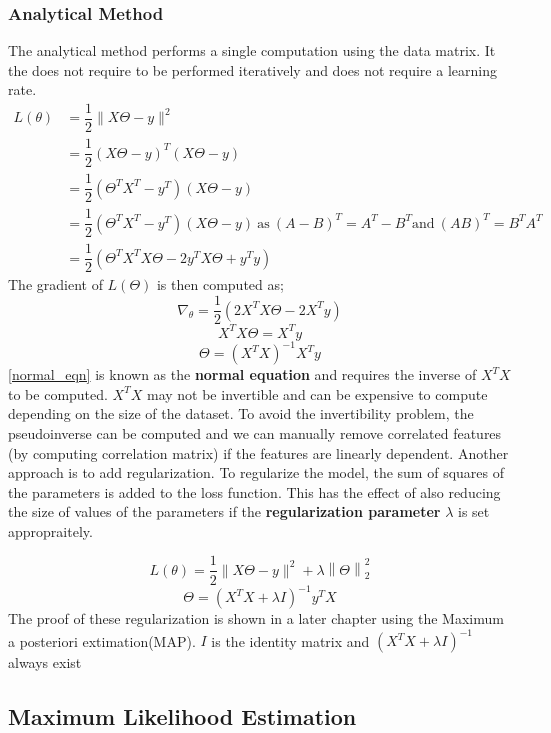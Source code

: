 \documentclass[11pt,a4paper,titlepage,landscape]{book}
\begin{document}
	\subsubsection{Analytical Method}
	The analytical method performs a single computation using the data matrix. It the does not require to be performed iteratively and does not require a learning rate.
	\begin{equation*}
		\begin{array}{cl}
		L(\theta) &= \dfrac{1}{2}\|X\Theta - y\|^2 \\
		&= \dfrac{1}{2}(X\Theta - y)^T(X\Theta - y) \\
		&= \dfrac{1}{2}(\Theta^{T}X^T - y^T)(X\Theta - y) \\
		&= \dfrac{1}{2}(\Theta^{T}X^T - y^T)(X\Theta - y) ~ \text{as} ~ (A - B)^T = A^T - B^T \text{and} ~ (AB)^T = B^TA^T \\
		&= \dfrac{1}{2}(\Theta^{T}X^TX\Theta - 2y^TX\Theta + y^Ty)
		\end{array}
	\end{equation*}
	The gradient of $L(\Theta)$ is then computed as;
	\begin{equation*}
		\nabla_\theta = \dfrac{1}{2}\left(2X^TX\Theta - 2X^Ty\right)
	\end{equation*}
	\begin{equation*}
	X^TX\Theta = X^Ty
	\end{equation*}
	\begin{equation}\label{normal_eqn}
	\Theta = \left(X^TX\right)^{-1}X^Ty
	\end{equation}
	\eqref{normal_eqn} is known as the \textbf{normal equation} and requires the inverse of $X^TX$ to be computed. $X^TX$ may not be invertible and can be expensive to compute depending on the size of the dataset. To avoid the invertibility problem, the pseudoinverse can be computed and we can manually remove correlated features (by computing correlation matrix) if the features are linearly dependent. Another approach is to add regularization. To regularize the model, the sum of squares of the parameters is added to the loss function. This has the effect of also reducing the size of values of the parameters if the \textbf{regularization parameter} $\lambda$ is set appropraitely.
	
	
	\begin{equation}
	L(\theta) = \dfrac{1}{2}\|X\Theta - y\|^2 + \lambda\left\|\Theta\right\|_2^2
	\end{equation}
	\begin{equation}
		\Theta = \left(X^TX + \lambda{I}\right)^{-1}y^TX
	\end{equation}
	The proof of these regularization is shown in a later chapter using the Maximum a posteriori extimation(MAP). $I$ is the identity matrix and $\left(X^TX + \lambda{I}\right)^{-1}$ always exist
	
	\subsection{Maximum Likelihood Estimation}
	
\end{document}
